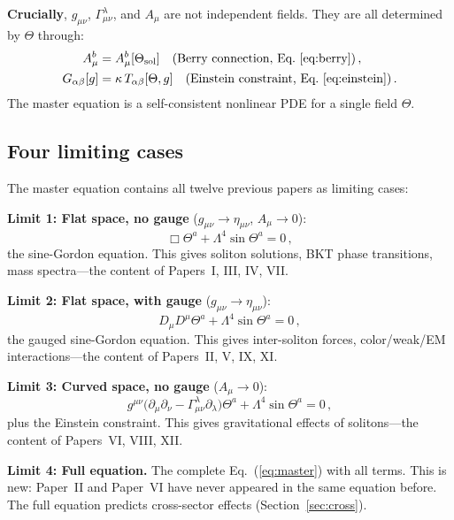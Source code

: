 \documentclass[twocolumn,preprintnumbers,amsmath,amssymb,prd]{revtex4-2}
\begin{document}
\textbf{Crucially}, $g_{\mu\nu}$, $\Gamma^\lambda_{\mu\nu}$, and $A_\mu$ are not independent fields.
They are all determined by $\Theta$ through:
\begin{align}
A_\mu^b &= A_\mu^b[\Theta_{\rm sol}] \quad\text{(Berry connection, Eq.~\ref{eq:berry})}\,,\\
G_{\alpha\beta}[g] &= \kappa\,T_{\alpha\beta}[\Theta,g] \quad\text{(Einstein constraint, Eq.~\ref{eq:einstein})}\,.
\end{align}
The master equation is a self-consistent nonlinear PDE for a single field $\Theta$.

\subsection{Four limiting cases}

The master equation contains all twelve previous papers as limiting cases:

\textbf{Limit 1: Flat space, no gauge} ($g_{\mu\nu} \to \eta_{\mu\nu}$, $A_\mu \to 0$):
\begin{equation}
\Box\Theta^a + \Lambda^4\sin\Theta^a = 0\,,
\end{equation}
the sine-Gordon equation.
This gives soliton solutions, BKT phase transitions, mass spectra---the content of Papers~I, III, IV, VII.

\textbf{Limit 2: Flat space, with gauge} ($g_{\mu\nu} \to \eta_{\mu\nu}$):
\begin{equation}
D_\mu D^\mu\Theta^a + \Lambda^4\sin\Theta^a = 0\,,
\end{equation}
the gauged sine-Gordon equation.
This gives inter-soliton forces, color/weak/EM interactions---the content of Papers~II, V, IX, XI.

\textbf{Limit 3: Curved space, no gauge} ($A_\mu \to 0$):
\begin{equation}
g^{\mu\nu}\bigl(\partial_\mu\partial_\nu - \Gamma^\lambda_{\mu\nu}\partial_\lambda\bigr)\Theta^a + \Lambda^4\sin\Theta^a = 0\,,
\end{equation}
plus the Einstein constraint.
This gives gravitational effects of solitons---the content of Papers~VI, VIII, XII.

\textbf{Limit 4: Full equation.}
The complete Eq.~(\ref{eq:master}) with all terms.
This is new: Paper~II and Paper~VI have never appeared in the same equation before.
The full equation predicts cross-sector effects (Section~\ref{sec:cross}).

\end{document}
